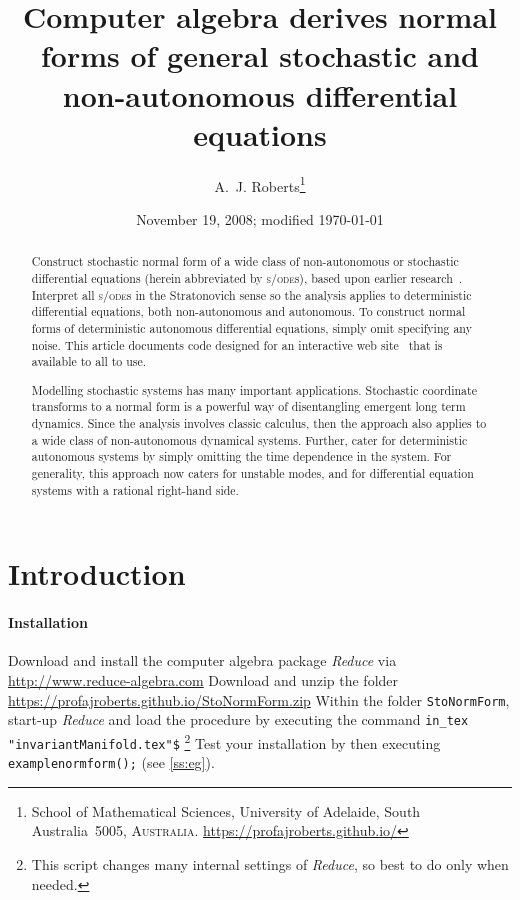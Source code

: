 \documentclass[11pt,a5paper]{article}
\title{Computer algebra derives normal forms of general
stochastic and non-autonomous differential equations}
\author{A.~J. Roberts\thanks{School of Mathematical
Sciences, University of Adelaide, South Australia~5005,
\textsc{Australia}. \url{https://profajroberts.github.io/}}}
\date{November 19, 2008; modified \today}
\def\sde{\textsc{s/ode}}
\begin{document}
\sloppy

\maketitle

\begin{abstract}
Construct stochastic normal form of a wide class of
non-autonomous or stochastic differential equations (herein
abbreviated by \sde{}s), based upon earlier
research~\cite[]{Cox91, Chao95, Roberts06k}. Interpret all
\sde{}s in the Stratonovich sense so the analysis applies to
deterministic differential equations, both non-autonomous
and autonomous. To construct normal forms of deterministic
autonomous differential equations, simply omit specifying
any noise. This article documents code designed for an
interactive web site~\cite[]{Roberts07d} that is available
to all to use.

Modelling stochastic systems has many important
applications. Stochastic coordinate transforms to a normal
form is a powerful way of disentangling emergent long term
dynamics. Since the analysis involves classic calculus, then
the approach also applies to a wide class of non-autonomous
dynamical systems. Further, cater for deterministic
autonomous systems by simply omitting the time dependence in
the system. For generality, this approach now caters for
unstable modes, and for differential equation systems with a
rational right-hand side.
\end{abstract}

\tableofcontents

\section{Introduction}

\paragraph{Installation}
Download and install the computer algebra package
\emph{Reduce} via \url{http://www.reduce-algebra.com}\quad
Download and unzip the folder
\url{https://profajroberts.github.io/StoNormForm.zip}
\quad Within the folder \verb|StoNormForm|, start-up
\emph{Reduce} and load the procedure by executing the
command \verb|in_tex "invariantManifold.tex"$|
\footnote{This script changes many internal settings of
\emph{Reduce}, so best to do only when needed.} Test your
installation by then executing \verb|examplenormform();|
\quad(see \cref{ss:eg}).
\end{document}
